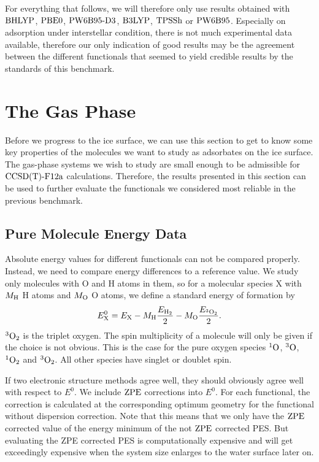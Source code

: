 \documentclass[8.5pt,twoside,twocolumn]{article}
\newcommand\zpe{\enmat{\te{ZPE}}}
\newcommand\singo{\enmat{{^1\te{O}}}}
\newcommand\tripo{\enmat{{^3\te{O}}}}
\newcommand\singot{\enmat{{^1\ot}}}
\newcommand\tripot{\enmat{{^3\ot}}}
\theoremstyle{standard}
\begin{document}
For everything that follows, we will therefore only use results obtained
with $\text{BHLYP}$, $\text{PBE0}$, $\text{PW6B95}\text{-D3}$, $\text{B3LYP}$, $\text{TPSSh}$ or $\text{PW6B95}$. Especially on
adsorption under interstellar condition, there is not much experimental
data available, therefore our only indication of good results may be
the agreement between the different functionals that seemed to yield credible
results by the standards of this benchmark.
  
\section{The Gas Phase}
\label{Sec:Gas}

Before we progress to the ice surface, we can use this section
to get to know some key properties of the molecules we want to
study as adsorbates on the ice surface. The gas-phase systems
we wish to study are small enough to be admissible for $\text{CCSD(T)-F12a}$
calculations. Therefore, the results presented in this section can
be used to further evaluate the functionals we considered most
reliable in the previous benchmark.

\subsection{Pure Molecule Energy Data}
\label{Sec:Gas:Energy}
Absolute energy values for different functionals can not be compared
properly. Instead, we need to compare energy differences to
a reference value. We study only molecules with O and H atoms
in them, so for a molecular species X with $M_{\text{H}}$ H atoms and 
$M_{\text O}$ O atoms, we define a standard energy of formation
by
\begin{equation}
E^0_\X=E_\X - M_{\te H} \frac {E_{\htw}} 2 - M_{\te O} \frac {E_{\tripot}} 2.
\label{Gas:FormationEnergy} 
\end{equation}
$\tripot$ is the triplet oxygen. The spin multiplicity of a molecule will
only be given if the choice is not obvious. This is the case for the
pure oxygen species $\singo$, $\tripo$, $\singot$ and $\tripot$. All other
species have singlet or doublet spin.

If two electronic
structure methods agree well, they should obviously agree well with respect to
$E^0$.
We include $\zpe$ corrections into $E^0$. For each functional, 
the correction is calculated at the corresponding optimum geometry
for the functional without dispersion correction. Note that this means
that we only have the $\zpe$ corrected value of the energy
minimum of the not $\zpe$ corrected PES. But evaluating the ZPE
corrected PES is computationally expensive and will get exceedingly expensive
when the system size enlarges to the water surface later on.
\end{document}
